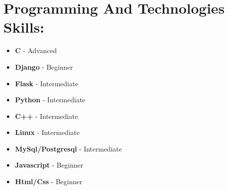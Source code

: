 \documentclass{article}
\begin{document}
\begin{minipage}[t]{8cm}
\section*{Programming And Technologies Skills:}
\begin{itemize}
  \setlength\itemsep{0.01cm}
\item \textbf{C} - Advanced
\item \textbf{Django} - Beginner  
\item \textbf{Flask} - Intermediate  
\item \textbf{Python} - Intermediate
\item \textbf{C++} - Intermediate
\item \textbf{Linux} - Intermediate
\item \textbf{MySql/Postgresql} - Intermediate  
\item \textbf{Javascript} - Beginner 
\item \textbf{Html/Css} - Beginner
\end{itemize}



\end{minipage}
\end{document}
